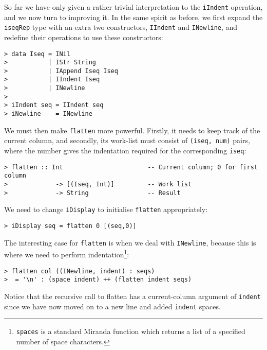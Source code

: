 So far we have only given a rather trivial interpretation to the \mbox{\tt iIndent}
operation, and we now turn to improving it.
In the same spirit as before, we first expand the \mbox{\tt iseqRep} type
with an extra two constructors, \mbox{\tt IIndent} and \mbox{\tt INewline}, and redefine
their operations to use these constructors:
\begin{verbatim}
> data Iseq = INil
>           | IStr String
>           | IAppend Iseq Iseq
>           | IIndent Iseq
>           | INewline
>
> iIndent seq = IIndent seq
> iNewline    = INewline
\end{verbatim}
%
%
%
%
%
%
%
We must then make \mbox{\tt flatten} more powerful.  Firstly, it needs
to keep track of the current column,
and secondly, its work-list must consist
of \mbox{\tt (iseq,\ num)} pairs, where the number gives the indentation required for
the corresponding \mbox{\tt iseq}:
\begin{verbatim}
> flatten :: Int                       -- Current column; 0 for first column
>             -> [(Iseq, Int)]         -- Work list
>             -> String                -- Result
\end{verbatim}
%
We need to change \mbox{\tt iDisplay} to initialise \mbox{\tt flatten} appropriately:
\begin{verbatim}
> iDisplay seq = flatten 0 [(seq,0)]
\end{verbatim}
%
The interesting case for \mbox{\tt flatten} is when we deal with \mbox{\tt INewline}, because
this is where we need to perform indentation\footnote{%
\mbox{\tt spaces} is a standard Miranda function which returns a list of a specified
number of space characters.
}:
\begin{verbatim}
> flatten col ((INewline, indent) : seqs)
>  = '\n' : (space indent) ++ (flatten indent seqs)
\end{verbatim}
%
Notice that the recursive call to flatten has a current-column argument
of \mbox{\tt indent} since we have now moved on to a new line and added \mbox{\tt indent}
spaces.

